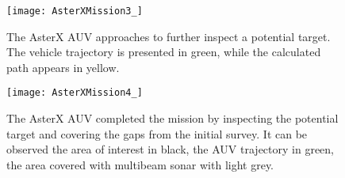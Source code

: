 \begin{figure}[htbp] %
\centering
	\texttt{[image: AsterXMission3\_]}
\caption[The AsterX AUV approaches to further inspect a potential target.]
{The AsterX AUV approaches to further inspect a potential target. The vehicle
trajectory is presented in green, while the calculated path appears in yellow.}
\label{fig:AsterXMission3}
\end{figure}

\begin{figure}[htbp] %
\centering
	\texttt{[image: AsterXMission4\_]}
\caption[The AsterX AUV completed the mission by inspecting the potential
target and covering the gaps from the initial survey.] 
{The AsterX AUV completed the mission by inspecting the potential
target and covering the gaps from the initial survey. It can be observed the
area of interest in black, the AUV trajectory in green, the area covered with
multibeam sonar with light grey.}
\label{fig:AsterXMission4}
\end{figure}


